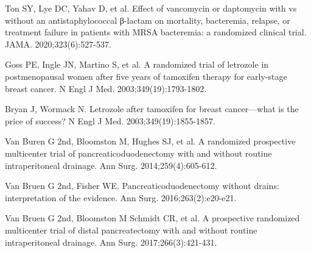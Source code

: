 \begin{references}
\item Ton SY, Lye DC, Yahav D, et al. Effect of vancomycin or daptomycin with vs without an antistaphylococcal β-lactam on mortality, bacteremia, relapse, or treatment failure in patients with MRSA bacteremia: a randomized clinical trial. JAMA. 2020;323(6):527-537.
\item Goss PE, Ingle JN, Martino S, et al. A randomized trial of letrozole in postmenopausal women after five years of tamoxifen therapy for early-stage breast cancer. N Engl J Med. 2003;349(19):1793-1802.
\item Bryan J, Wormack N. Letrozole after tamoxifen for breast cancer—what is the price of success? N Engl J Med. 2003;349(19):1855-1857.
\item Van Buren G 2nd, Bloomston M, Hughes SJ, et al. A randomized prospective multicenter trial of pancreaticoduodenectomy with and without routine intraperitoneal drainage. Ann Surg. 2014;259(4):605-612.
\item Van Bruen G 2nd, Fisher WE. Pancreaticoduodenectomy without drains: interpretation of the evidence. Ann Surg. 2016;263(2):e20-e21.
\item Van Bruen G 2nd, Bloomston M Schmidt CR, et al. A prospective randomized multicenter trial of distal pancreatectomy with and without routine intraperitoneal drainage. Ann Surg. 2017;266(3):421-431.
\end{references}
